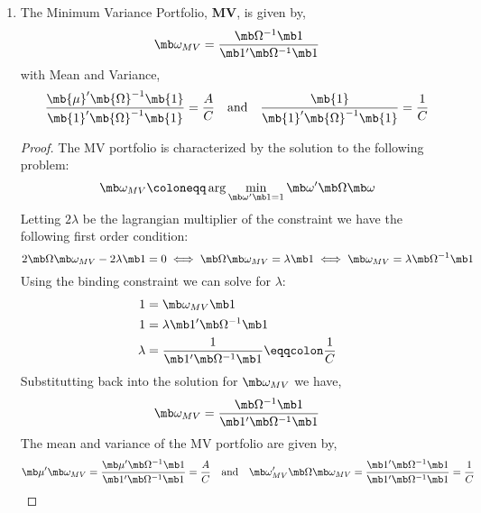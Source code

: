 \begin{solution}
\begin{enumerate}
    \item 
    \setcounter{result}{1}
    \begin{result} 
        The Minimum Variance Portfolio, \textbf{MV}, is given by,
        \[
            \mb\omega_{MV} = \frac{\mb\Omega^{-1}\mb 1}{\mb 1^\prime\mb\Omega^{-1}\mb 1}
        \]
        with Mean and Variance,
        \[
            \frac{\mb{\mu}^\prime\mb{\Omega}^{-1}\mb{1}}{\mb{1}^\prime\mb{\Omega}^{-1}\mb{1}} = \frac{A}{C} \quad \text{and} \quad \frac{\mb{1}}{\mb{1}^\prime\mb{\Omega}^{-1}\mb{1}} = \frac{1}{C}
        \]
    \end{result}
    \begin{proof}
        The MV portfolio is characterized by the solution to the following problem:
        \[
            \mb\omega_{MV} \coloneqq \arg\min_{\mb\omega^\prime\mb 1 = 1} \mb\omega^\prime\mb\Omega\mb\omega
        \]
        Letting \(2\lambda\) be the lagrangian multiplier of the constraint we have the following first order condition:
        \[
            2\mb\Omega\mb\omega_{MV} - 2\lambda\mb 1 = 0 \iff \mb\Omega\mb\omega_{MV} = \lambda\mb 1 \iff \mb\omega_{MV} = \lambda\mb\Omega^{-1}\mb 1
        \]
        Using the binding constraint we can solve for \(\lambda\):
        \begin{align*}
            1 & = \mb\omega_{MV}\mb 1 \\ 
            1 & = \lambda \mb 1^\prime \mb \Omega^{-1} \mb 1 \\
            \lambda & = \frac{1}{\mb 1^\prime \mb \Omega^{-1} \mb 1} \eqqcolon \frac{1}{C}
        \end{align*}
        Substitutting back into the solution for \(\mb\omega_{MV}\) we have,
        \[
            \mb\omega_{MV} = \frac{\mb\Omega^{-1}\mb 1}{\mb 1^\prime \mb \Omega^{-1} \mb 1}
        \]
        The mean and variance of the MV portfolio are given by,
        \[
            \mb \mu^\prime \mb\omega_{MV}  = \frac{\mb\mu^\prime\mb\Omega^{-1}\mb 1}{\mb 1^\prime \mb \Omega^{-1} \mb 1} = \frac{A}{C} \quad \text{and} \quad \mb\omega_{MV}^\prime \mb \Omega \mb\omega_{MV} = \frac{\mb 1^\prime \mb \Omega^{-1} \mb 1}{\mb 1^\prime \mb \Omega^{-1} \mb 1} = \frac{1}{C}
        \]
    \end{proof}


\end{enumerate}
\end{solution}
